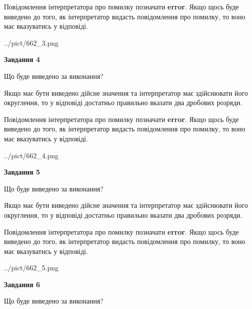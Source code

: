 \documentclass[12pt, ukrainian]{article}
\begin{document}
{\begin {Large}
Повідомлення інтерпретатора про помилку позначати \textbf{error}.
Якщо щось буде виведено до того, як інтерпретатор видасть повідомлення про помилку, 
то воно має вказуватись у відповіді. \par

\begin{center}
	{../pict/662_3.png}
\end{center}
\newpage

{\begin {center}\textbf{Завдання 4}\end {center}}\par
Що буде виведено за виконання? \par

Якщо має бути виведено дійсне значення та інтерпретатор має здійснювати його округлення, 
то у відповіді достатньо правильно вказати два дробових розряди.

Повідомлення інтерпретатора про помилку позначати \textbf{error}.
Якщо щось буде виведено до того, як інтерпретатор видасть повідомлення про помилку, 
то воно має вказуватись у відповіді. \par

\begin{center}
	{../pict/662_4.png}
\end{center}
\newpage

{\begin {center}\textbf{Завдання 5}\end {center}}\par
Що буде виведено за виконання? \par

Якщо має бути виведено дійсне значення та інтерпретатор має здійснювати його округлення, 
то у відповіді достатньо правильно вказати два дробових розряди.

Повідомлення інтерпретатора про помилку позначати \textbf{error}.
Якщо щось буде виведено до того, як інтерпретатор видасть повідомлення про помилку, 
то воно має вказуватись у відповіді. \par

\begin{center}
	{../pict/662_5.png}
\end{center}
\newpage

{\begin {center}\textbf{Завдання 6}\end {center}}\par
Що буде виведено за виконання? \par


\end{Large}}
\end{document}
